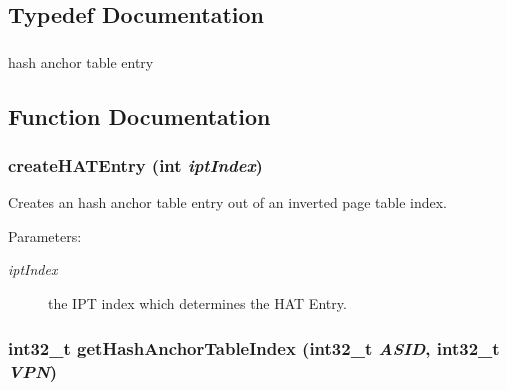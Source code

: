 \subsection{Typedef Documentation}
\hypertarget{group___v_m_m___h_a_t_g06b98a0b294446afee1b27a04682d7c2}{
\subsubsection[{HashAnchorTableEntry}]{}}
\label{group___v_m_m___h_a_t_g06b98a0b294446afee1b27a04682d7c2}


hash anchor table entry 

\subsection{Function Documentation}
\hypertarget{group___v_m_m___h_a_t_g675250e60a6a6b29b540d8a029db25bf}{
\subsubsection[{createHATEntry}]{ createHATEntry (int {\em iptIndex})}}
\label{group___v_m_m___h_a_t_g675250e60a6a6b29b540d8a029db25bf}


Creates an hash anchor table entry out of an inverted page table index. \begin{Desc}
\item[Parameters:]
\begin{description}
\item[{\em iptIndex}]the IPT index which determines the HAT Entry. \end{description}
\end{Desc}
\hypertarget{group___v_m_m___h_a_t_g25766528701c0fd3f34edbe61803e398}{
\subsubsection[{getHashAnchorTableIndex}]{\setlength{\rightskip}{0pt plus 5cm}int32\_\-t getHashAnchorTableIndex (int32\_\-t {\em ASID}, \/  int32\_\-t {\em VPN})}}
\label{group___v_m_m___h_a_t_g25766528701c0fd3f34edbe61803e398}


